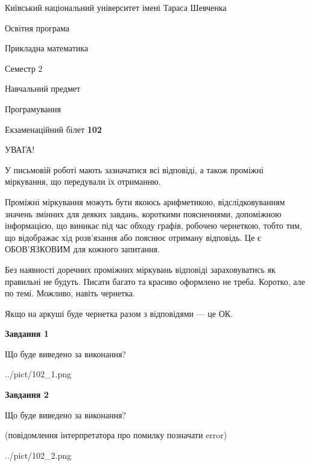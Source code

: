 \documentclass[12pt, ukrainian]{article}
\begin{document}
{{\begin {small}\par
{ \center  Київський національний університет імені Тараса Шевченка \par}
{\parbox {5 cm}{Освітня програма \hfill}{\parbox {7 cm}{Прикладна математика\hfill}}\parbox {6 cm}{\hfill Семестр 2}}\par
{\parbox {5 cm} {Навчальний предмет \hfill}\parbox {7 cm}{Програмування \hfill}\parbox {6cm}{\hfill}\par}\vspace{-7pt} \end{small}}{\center Екзаменаційний білет \No \textbf
{ 102 }\par}}
{
\begin {large}
УВАГА!

У письмовій роботі мають зазначатися всі відповіді, а також проміжні міркування, що передували їх отриманню.

Проміжні міркування можуть бути якоюсь арифметикою, відслідковуванням зна\-чень змінних для деяких завдань,
короткими поясненнями, допоміжною інформацією, що виникає під час обходу графів, робочею чернеткою,
тобто тим, що відображає хід розв’язання або пояснює отриману відповідь.
Це є ОБОВ’ЯЗКОВИМ для кожного запитання.

Без наявності доречних проміжних міркувань відповіді зараховуватись як правиль\-ні не будуть.
Писати багато та красиво оформлено не треба. Коротко, але по темі. Можли\-во, навіть чернетка.

Якщо на аркуші буде чернетка разом з відповідями --- це ОК.

\newpage

{\begin {center}\textbf{Завдання 1}\end {center}}\par
Що буде виведено за виконання?\par
\begin{center}
	{../pict/102_1.png}
\end{center}
\newpage

{\begin {center}\textbf{Завдання 2}\end {center}}\par
Що буде виведено за виконання?\par
 (повідомлення інтерпретатора про помилку позначати error)\par
\begin{center}
	{../pict/102_2.png}
\end{center}
\newpage


\end{large}}
\end{document}
